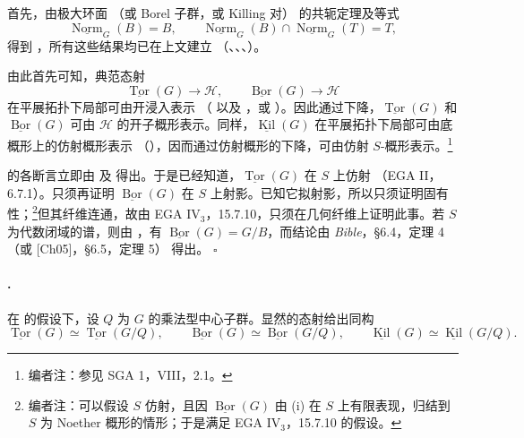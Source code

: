 首先，由极大环面 \textup{（或 Borel 子群，或 Killing 对）} 的共轭定理及等式
\[
  \underline{\operatorname{Norm}}_G(B)=B,
  \qquad
  \underline{\operatorname{Norm}}_G(B)
  \cap
  \underline{\operatorname{Norm}}_G(T)=T,
\]
得到 \textup{}，所有这些结果均已在上文建立 \textup{（、、、）}。

由此首先可知，典范态射
\[
  \underline{\operatorname{Tor}}(G)\longrightarrow\mathcal H,
  \qquad
  \underline{\operatorname{Bor}}(G)\longrightarrow\mathcal H
\]
在平展拓扑下局部可由开浸入表示 \textup{（ 以及 ，或 ）}。因此通过下降，\(\underline{\operatorname{Tor}}(G)\) 和 \(\underline{\operatorname{Bor}}(G)\) 可由 \(\mathcal H\) 的开子概形表示。同样，\(\underline{\operatorname{Kil}}(G)\) 在平展拓扑下局部可由底概形上的仿射概形表示 \textup{（）}，因而通过仿射概形的下降，可由仿射 \(S\)-概形表示。\footnote{编者注：参见 SGA 1，VIII，2.1。}

\textup{} 的各断言立即由 \textup{} 及  得出。于是已经知道，\(\underline{\operatorname{Tor}}(G)\) 在 \(S\) 上仿射 \textup{（EGA II，6.7.1）}。只须再证明 \(\underline{\operatorname{Bor}}(G)\) 在 \(S\) 上射影。已知它拟射影，所以只须证明固有性；\footnote{编者注：可以假设 \(S\) 仿射，且因 \(\underline{\operatorname{Bor}}(G)\) 由 \textup{(i)} 在 \(S\) 上有限表现，归结到 \(S\) 为 Noether 概形的情形；于是满足 EGA IV\(_3\)，15.7.10 的假设。}但其纤维连通，故由 EGA IV\(_3\)，15.7.10，只须在几何纤维上证明此事。若 \(S\) 为代数闭域的谱，则由 \textup{}，有 \(\underline{\operatorname{Bor}}(G)=G/B\)，而结论由 \emph{Bible}，\S6.4，定理 4 \textup{（或 [Ch05]，\S6.5，定理 5）} 得出。
\hfill\(\square\)

\paragraph{.}
在  的假设下，设 \(Q\) 为 \(G\) 的乘法型中心子群。显然的态射给出同构
\[
  \underline{\operatorname{Tor}}(G)
  \simeq
  \underline{\operatorname{Tor}}(G/Q),
  \qquad
  \underline{\operatorname{Bor}}(G)
  \simeq
  \underline{\operatorname{Bor}}(G/Q),
  \qquad
  \underline{\operatorname{Kil}}(G)
  \simeq
  \underline{\operatorname{Kil}}(G/Q).
\]

